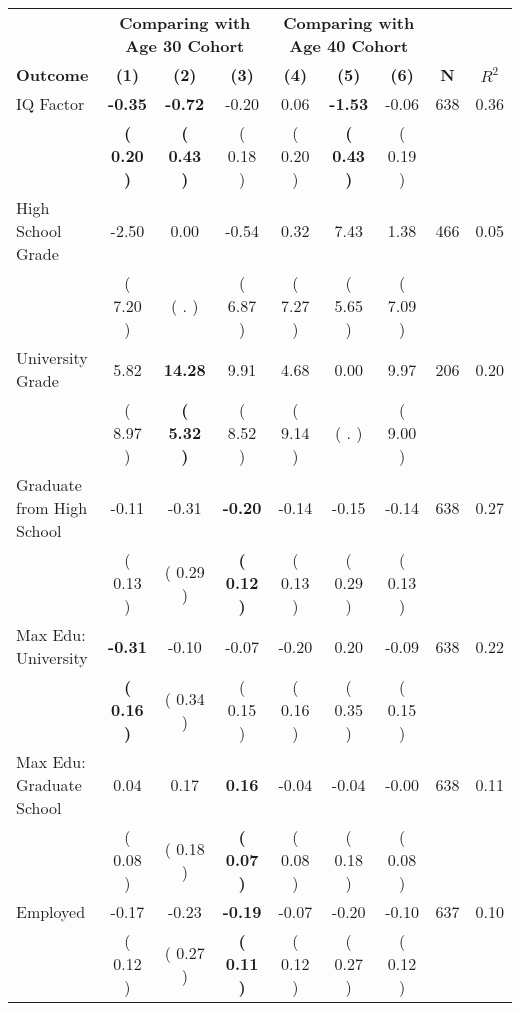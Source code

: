 \begin{tabular}{lcccccccc}
\toprule
 & \multicolumn{3}{c}{\textbf{Comparing with Age 30 Cohort}} & \multicolumn{3}{c}{\textbf{Comparing with Age 40 Cohort}} & \\
\cmidrule(lr){2-4} \cmidrule(lr){5-7} 
 \textbf{Outcome} & \textbf{(1)} & \textbf{(2)} & \textbf{(3)} & \textbf{(4)} & \textbf{(5)} & \textbf{(6)} & \textbf{N} & \textbf{$ R^2$} \\
\midrule
IQ Factor & \textbf{    -0.35} & \textbf{    -0.72} &     -0.20 &      0.06 & \textbf{    -1.53} &     -0.06 & 638 &       0.36 \\ 
 & \textbf{(     0.20 )} & \textbf{(     0.43 )} & (     0.18 ) & (     0.20 ) & \textbf{(     0.43 )} & (     0.19 ) & \\
High School Grade &     -2.50 &      0.00 &     -0.54 &      0.32 &      7.43 &      1.38 & 466 &       0.05 \\ 
 & (     7.20 ) & (        . ) & (     6.87 ) & (     7.27 ) & (     5.65 ) & (     7.09 ) & \\
University Grade &      5.82 & \textbf{    14.28} &      9.91 &      4.68 &      0.00 &      9.97 & 206 &       0.20 \\ 
 & (     8.97 ) & \textbf{(     5.32 )} & (     8.52 ) & (     9.14 ) & (        . ) & (     9.00 ) & \\
Graduate from High School &     -0.11 &     -0.31 & \textbf{    -0.20} &     -0.14 &     -0.15 &     -0.14 & 638 &       0.27 \\ 
 & (     0.13 ) & (     0.29 ) & \textbf{(     0.12 )} & (     0.13 ) & (     0.29 ) & (     0.13 ) & \\
Max Edu: University & \textbf{    -0.31} &     -0.10 &     -0.07 &     -0.20 &      0.20 &     -0.09 & 638 &       0.22 \\ 
 & \textbf{(     0.16 )} & (     0.34 ) & (     0.15 ) & (     0.16 ) & (     0.35 ) & (     0.15 ) & \\
Max Edu: Graduate School &      0.04 &      0.17 & \textbf{     0.16} &     -0.04 &     -0.04 &     -0.00 & 638 &       0.11 \\ 
 & (     0.08 ) & (     0.18 ) & \textbf{(     0.07 )} & (     0.08 ) & (     0.18 ) & (     0.08 ) & \\
Employed &     -0.17 &     -0.23 & \textbf{    -0.19} &     -0.07 &     -0.20 &     -0.10 & 637 &       0.10 \\ 
 & (     0.12 ) & (     0.27 ) & \textbf{(     0.11 )} & (     0.12 ) & (     0.27 ) & (     0.12 ) & \\

\end{tabular}

